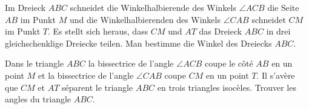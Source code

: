 Im Dreieck $ABC$ schneidet die Winkelhalbierende des Winkels $\angle ACB$ die Seite $AB$ im Punkt $M$ und die Winkelhalbierenden des Winkels $\angle CAB$ schneidet $CM$ im Punkt $T$. Es stellt sich heraus, dass $CM$ und $AT$ das Dreieck $ABC$ in drei gleichschenklige Dreiecke teilen. Man bestimme die Winkel des Dreiecks $ABC$.

\bigskip

Dans le triangle $ABC$ la bissectrice de l'angle $\angle ACB$ coupe le côté $AB$ en un point $M$ et la bissectrice de l'angle $\angle CAB$ coupe $CM$ en un point $T$. Il s'avère que $CM$ et $AT$ séparent le triangle $ABC$ en trois triangles isocèles. Trouver les angles du triangle $ABC$.